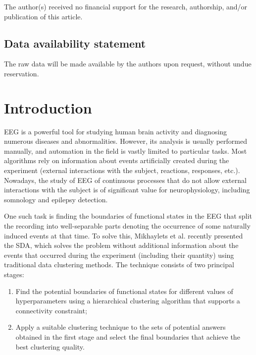 \documentclass[shortAfour,times,sagev]{sagej}
\begin{document}
The author(s) received no financial support for the research, authorship,
and/or publication of this article.

\subsection{Data availability statement}

The raw data will be made available by the authors upon request, without undue reservation.


\section{Introduction}

EEG is a powerful tool for studying human brain activity and diagnosing numerous diseases and abnormalities. However, its analysis is usually performed manually, and automation in the field is vastly limited to particular tasks. Most algorithms rely on information about events artificially created during the experiment (external interactions with the subject, reactions, responses, etc.). Nowadays, the study of EEG of continuous processes that do not allow external interactions with the subject is of significant value for neurophysiology, including somnology and epilepsy detection.

One such task is finding the boundaries of functional states in the EEG that split the recording into well-separable parts denoting the occurrence of some naturally induced events at that time. To solve this, Mikhaylets et al. \cite{SDA} recently presented the SDA, which solves the problem without additional information about the events that occurred during the experiment (including their quantity) using traditional data clustering methods. The technique consists of two principal stages:

\begin{enumerate}
    \item
        Find the potential boundaries of functional states for different values of hyperparameters
        using a hierarchical clustering algorithm that supports a connectivity constraint;
    \item
        Apply a suitable clustering technique to the sets of potential answers obtained in the first stage
        and select the final boundaries that achieve the best clustering quality.
\end{enumerate}
\end{document}
